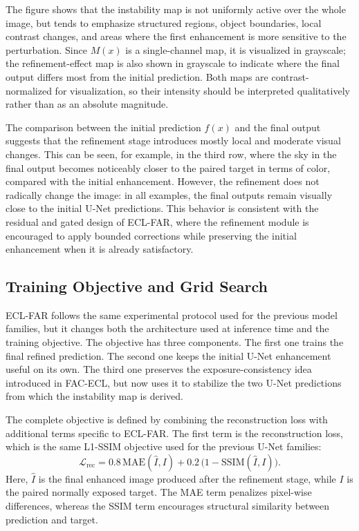 

The figure shows that the instability map is not uniformly active over the whole image, but tends to emphasize structured regions, object boundaries, local contrast changes, and areas where the first enhancement is more sensitive to the perturbation. Since $M(x)$ is a single-channel map, it is visualized in grayscale; the refinement-effect map is also shown in grayscale to indicate where the final output differs most from the initial prediction. Both maps are contrast-normalized for visualization, so their intensity should be interpreted qualitatively rather than as an absolute magnitude.

The comparison between the initial prediction $f(x)$ and the final output suggests that the refinement stage introduces mostly local and moderate visual changes. This can be seen, for example, in the third row, where the sky in the final output becomes noticeably closer to the paired target in terms of color, compared with the initial enhancement. However, the refinement does not radically change the image: in all examples, the final outputs remain visually close to the initial U-Net predictions. This behavior is consistent with the residual and gated design of ECL-FAR, where the refinement module is encouraged to apply bounded corrections while preserving the initial enhancement when it is already satisfactory.

\subsection{Training Objective and Grid Search}

ECL-FAR follows the same experimental protocol used for the previous model families, but it changes both the architecture used at inference time and the training objective. The objective has three components. The first one trains the final refined prediction. The second one keeps the initial U-Net enhancement useful on its own. The third one preserves the exposure-consistency idea introduced in FAC-ECL, but now uses it to stabilize the two U-Net predictions from which the instability map is derived.

The complete objective is defined by combining the reconstruction loss with additional terms specific to ECL-FAR. The first term is the reconstruction loss, which is the same L1-SSIM objective used for the previous U-Net families:
\begin{equation}
	\mathcal{L}_{\mathrm{rec}}
	=
	0.8\,\mathrm{MAE}(\hat{I}, I)
	+
	0.2\,\bigl(1-\mathrm{SSIM}(\hat{I}, I)\bigr).
	\label{eq:ecl_far_rec_loss}
\end{equation}
Here, $\hat{I}$ is the final enhanced image produced after the refinement stage, while $I$ is the paired normally exposed target. The MAE term penalizes pixel-wise differences, whereas the SSIM term encourages structural similarity between prediction and target.

